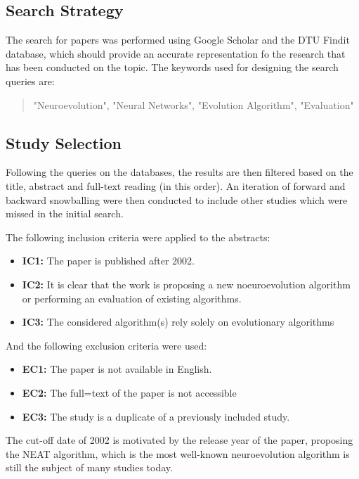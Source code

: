 \subsection{Search Strategy}

The search for papers was performed using Google Scholar and the DTU Findit database, which should provide an accurate representation fo the research that has been
conducted on the topic. The keywords used for designing the search queries are:

\begin{quote}
    "Neuroevolution", "Neural Networks", "Evolution Algorithm", "Evaluation"
\end{quote}

\subsection{Study Selection}

Following the queries on the databases, the results are then filtered based on the title, abstract and full-text reading (in this order). An iteration of forward
and backward snowballing were then conducted to include other studies which were missed in the initial search.

The following inclusion criteria were applied to the abstracts:

\begin{itemize}
    \item \textbf{IC1:} The paper is published after 2002.
    \item \textbf{IC2:} It is clear that the work is proposing a new noeuroevolution algorithm or performing an evaluation of existing algorithms.
    \item \textbf{IC3:} The considered algorithm(s) rely solely on evolutionary algorithms
\end{itemize}

And the following exclusion criteria were used:

\begin{itemize}
    \item \textbf{EC1:} The paper is not available in English.
    \item \textbf{EC2:} The full=text of the paper is not accessible
    \item \textbf{EC3:} The study is a duplicate of a previously included study.
\end{itemize}

The cut-off date of 2002 is motivated by the release year of the \cite{..} paper, proposing the NEAT algorithm, which is the most well-known neuroevolution algorithm
is still the subject of many studies today.

